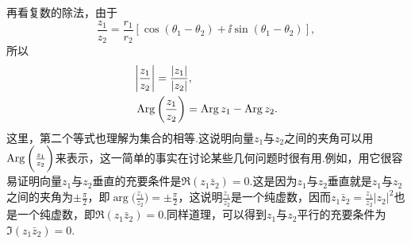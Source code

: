 再看复数的除法，由于
\[
  \frac{z_1}{z_2} = \frac{r_1}{r_2}[\cos(\theta_1 - \theta_2) + \ii\sin(\theta_1 - \theta_2)],
\]
所以
\begin{align*}
  & \bigg| \frac{z_1}{z_2} \bigg| = \frac{|z_1|}{|z_2|},\\
  & \operatorname{Arg}\bigg( \frac{z_1}{z_2} \bigg) = \operatorname{Arg} z_1-\operatorname{Arg} z_2.
\end{align*}
这里，第二个等式也理解为集合的相等.这说明向量$z_1$与$z_2$之间的夹角可以用$\operatorname{Arg} \bigg(\frac{z_1}{z_2}\bigg)$来表示，这一简单的事实在讨论某些几何问题时很有用.例如，用它很容易证明向量$z_1$与$z_2$垂直的充要条件是$\Re (z_1\bar z_2)=0$.这是因为$z_1$与$z_2$垂直就是$z_1$与$z_2$之间的夹角为$\pm\frac\pi2$，即$\arg \bigg(\frac{z_1}{z_2}\bigg)=\pm\frac\pi2$，这说明$\frac{z_1}{z_2}$是一个纯虚数，因而$z_1\bar z_2=\frac{z_1}{z_2}|z_2|^2$也是一个纯虚数，即$\Re(z_1\bar z_2)=0$.同样道理，可以得到$z_1$与$z_2$平行的充要条件为$\Im(z_1\bar z_2)=0$.

